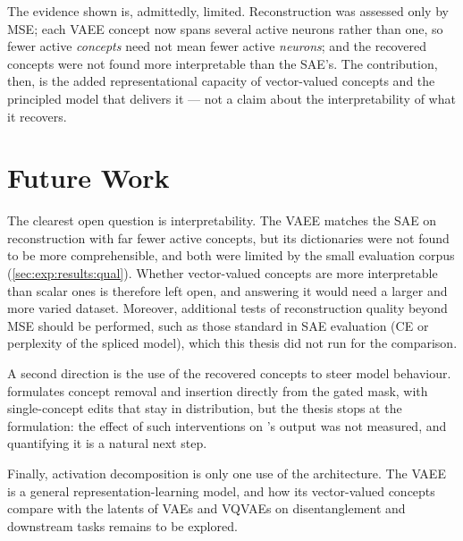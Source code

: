 The evidence shown is, admittedly, limited.
Reconstruction was assessed only by \acl{MSE}; each \ac{VAEE} concept now spans
several active neurons rather than one, so fewer active \textit{concepts} need
not mean fewer active \textit{neurons}; and the recovered concepts were not
found more interpretable than the \ac{SAE}'s. The contribution, then, is the
added representational capacity of vector-valued concepts and the principled
model that delivers it --- not a claim about the interpretability of what it
recovers.

\section{Future Work} \label{sec:conclusions:future}

The clearest open question is interpretability. The \ac{VAEE} matches the
\ac{SAE} on reconstruction with far fewer active concepts, but its dictionaries
were not found to be more comprehensible, and both were limited by the small
evaluation corpus
(\cref{sec:exp:results:qual}). Whether
vector-valued concepts are more interpretable than scalar ones is therefore left
open, and answering it would need a larger and more varied dataset. Moreover,
additional tests of reconstruction quality beyond \acl{MSE} should be performed,
such as those standard in \ac{SAE} evaluation (\acl{CE} or perplexity of the
spliced model), which this thesis did not run for the comparison.

A second direction is the use of the recovered concepts to steer model
behaviour. 
formulates concept removal and insertion directly from the gated mask, with
single-concept edits that stay in distribution, but the thesis stops at the
formulation: the effect of such interventions on 's output was not
measured, and quantifying it is a natural next step.

Finally, activation decomposition is only one use of the architecture. The
\ac{VAEE} is a general representation-learning model, and how its vector-valued
concepts compare with the latents of \acp{VAE} and \acp{VQVAE} on
disentanglement and downstream tasks remains to be explored. %


